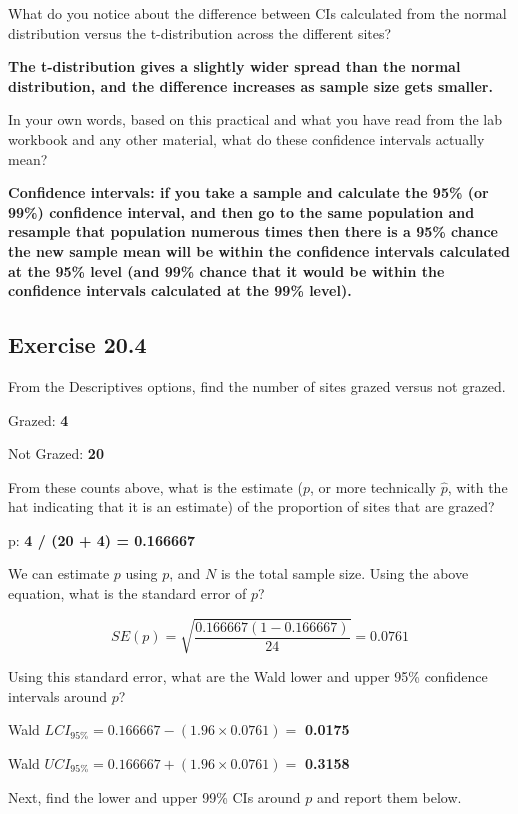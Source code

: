 \documentclass[
  openany]{scrbook}
\begin{document}
What do you notice about the difference between CIs calculated from the normal distribution versus the t-distribution across the different sites?

\textbf{The t-distribution gives a slightly wider spread than the normal distribution, and the difference increases as sample size gets smaller.}

In your own words, based on this practical and what you have read from the lab workbook and any other material, what do these confidence intervals actually mean?

\textbf{Confidence intervals: if you take a sample and calculate the 95\% (or 99\%) confidence interval, and then go to the same population and resample that population numerous times then there is a 95\% chance the new sample mean will be within the confidence intervals calculated at the 95\% level (and 99\% chance that it would be within the confidence intervals calculated at the 99\% level).}

\hypertarget{exercise-20.4}{%
\subsection{Exercise 20.4}\label{exercise-20.4}}

From the Descriptives options, find the number of sites grazed versus not grazed.

Grazed: \textbf{4}

Not Grazed: \textbf{20}

From these counts above, what is the estimate (\(p\), or more technically \(\hat{p}\), with the hat indicating that it is an estimate) of the proportion of sites that are grazed?

p: \textbf{4 / (20 + 4) = 0.166667}

We can estimate \(p\) using \(p\), and \(N\) is the total sample size. Using the above equation, what is the standard error of \(p\)?

\[SE(p) = \sqrt{\frac{0.166667(1 - 0.166667)}{24}} = 0.0761\]

Using this standard error, what are the Wald lower and upper 95\% confidence intervals around \(p\)?

Wald \(LCI_{95\%} = 0.166667 - (1.96 \times 0.0761) =\) \textbf{0.0175}

Wald \(UCI_{95\%} = 0.166667 + (1.96 \times 0.0761) =\) \textbf{0.3158}

Next, find the lower and upper 99\% CIs around \(p\) and report them below.
\end{document}
